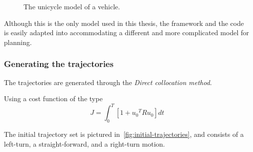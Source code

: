 \begin{figure}
  \centering
  \caption{The unicycle model of a vehicle.}
  \label{fig:second-order-unicycle}
\end{figure} 

Although this is the only model used in this thesis, the framework and the code
is easily adapted into accommodating a different and more complicated model for
planning.


\subsubsection{Generating the trajectories}

The trajectories are generated through the \textit{Direct collocation method}.

Using a cost function of the type
\begin{equation}
  J = \int_{0}^{T} \left[ 1 + {u_{0}}^{T}Ru_{0} \right] dt
\end{equation}

The initial trajectory set is pictured in~\ref{fig:initial-trajectories}, and
consists of a left-turn, a straight-forward, and a right-turn motion.

